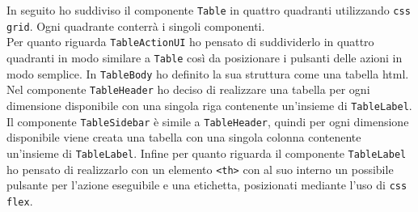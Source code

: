 \noindent
In seguito ho suddiviso il componente \verb|Table| in quattro quadranti utilizzando \verb|css grid|. Ogni quadrante conterrà i singoli componenti. \\
Per quanto riguarda \verb|TableActionUI| ho pensato di suddividerlo in quattro quadranti in modo similare a \verb|Table| così da posizionare i pulsanti delle azioni in modo semplice.
In \verb|TableBody| ho definito la sua struttura come una tabella html.
Nel componente \verb|TableHeader| ho deciso di realizzare una tabella per ogni dimensione disponibile con una singola riga contenente un'insieme di \verb|TableLabel|.
Il componente \verb|TableSidebar| è simile a \verb|TableHeader|, quindi per ogni dimensione disponibile viene creata una tabella con una singola colonna contenente un'insieme di \verb|TableLabel|.
Infine per quanto riguarda il componente \verb|TableLabel| ho pensato di realizzarlo con un elemento \verb|<th>| con al suo interno un possibile pulsante per l'azione eseguibile e una etichetta, posizionati mediante l'uso di \verb|css flex|.














